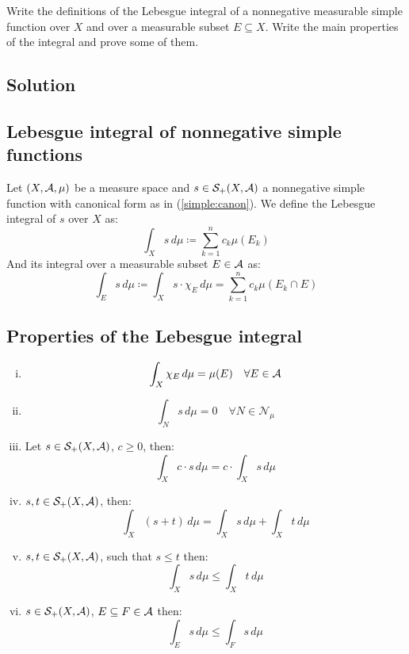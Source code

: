 
\question

Write the definitions of the Lebesgue integral of a nonnegative measurable simple 
function over $X$ and over a measurable subset $E \subseteq X$. Write the main properties of the integral and prove some of them.

\subsection*{Solution}

\subsection{Lebesgue integral of nonnegative simple functions}
Let $(X,\mathcal{A},\mu)$ be a measure space and $s\in\mathcal{S}_+(X,\mathcal{A})$ a nonnegative simple function with canonical form as in (\ref{simple:canon}). We define the Lebesgue integral of $s$ over $X$ as:
\[
    \int_X s\,d\mu \coloneqq \sum_{k=1}^n c_k \mu(E_k)
\]
And its integral over a measurable subset $E\in \mathcal{A}$ as:
\[
    \int_E s\,d\mu \coloneqq \int_X s\cdot \chi_E \, d\mu = \sum_{k=1}^n c_k \mu(E_k\cap E)
\]

\subsection{Properties of the Lebesgue integral}
\begin{enumerate}[i)]
    \item 
        \[
            \int_X \chi_E\,d\mu = \mu(E) \quad \forall E\in \mathcal{A}
        \]
    \item \label{LebInt:null}
        \[
            \int_N s\,d\mu = 0 \quad \forall N \in \mathcal{N}_\mu
        \]
    \item Let $s\in\mathcal{S}_+(X,\mathcal{A})$, $c\geq 0$, then:
        \[
            \int_X c\cdot s \,d\mu = c\cdot\int_X  s \,d\mu   
        \]
    \item $s,t\in \mathcal{S}_+(X,\mathcal{A})$, then:
        \[
            \int_X (s+t) \,d\mu = \int_X s \,d\mu + \int_X t \,d\mu
        \]
    \item \label{LebInt:monofunc}$s,t \in \mathcal{S}_+(X,\mathcal{A})$, such that $s\leq t$ then:
        \[
            \int_X s \,d\mu \leq \int_X t \,d\mu
        \]
    \item \label{LebInt:monoset}$s\in\mathcal{S}_+(X,\mathcal{A})$, $E\subseteq F \in\mathcal{A}$ then:
        \[
            \int_E s \,d\mu \leq \int_F s \,d\mu
        \]
\end{enumerate}

